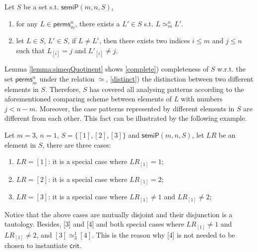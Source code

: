 \documentclass[conference]{IEEEtran}
\newcommand\lyj[1]{\textcolor{magenta}{#1}}
\begin{document}
{\vspace{-5pt}
\begin{lemma}\label{lemma:simeqQuotinent}  Let $S $ be a set s.t.  $\mathsf{semiP}(m,n,S)$,
\begin{enumerate}[leftmargin=14pt,noitemsep,nolistsep]
\item \label{complete}  for any $L \in \mathsf{perms}_{m}^{n}$, there exists a $L' \in S$ s.t. $L \simeq_m^n L'$.
\item \label{distinct} let $L \in S$, $L' \in S$, if $L \ne L'$, then there exists two indices $i \le m$ and $j \le n$ such that $L_{[i]}=j$ and $L'_{[i]}\ne j$.
\end{enumerate}
\end{lemma}
\vspace{-5pt}
Lemma \ref{lemma:simeqQuotinent} shows \ref{complete}) completeness of $S$ w.r.t. the set $\mathsf{perms}_{m}^{n}$ under the relation $\simeq$, \ref{distinct})  the distinction between two different elements in $S$. Therefore, $S$ has covered all analysing patterns according to the aforementioned comparing scheme between elements of $L$ with numbers $j<n-m$. Moreover, the case patterns represented by different elements in $S$ are different from each other. This fact can be illustrated by the following example.

\vspace{-5pt}
\begin{example}
Let $m=3$, $n=1$, $S=\{[1],[2],[3]\}$ and  $\mathsf{semiP}(m,n,S)$,  let $LR$ be an element in $S$, there are three cases:
\begin{enumerate}[leftmargin=14pt,noitemsep,nolistsep]
\item $LR=[1]$: it is a special case where $LR_{[1]}=1 $;
\item $LR=[2]$: it is a special case where $LR_{[1]}=2 $;
\item $LR=[3]$: it is a special case where $LR_{[1]}\ne 1$ and $LR_{[1]}\ne 2$;
\end{enumerate}
\end{example}
\vspace{-5pt}
Notice that the above cases are mutually disjoint and their disjunction  is a tautology. Besides, [3] and [4] and both special cases where $LR_{[1]}\ne 1$ and $LR_{[1]}\ne 2$, and $[3] \simeq_3^1 [4]$. This is the reason why [4] is not needed to be chosen to instantiate $\mathsf{crit}$.

}
\end{document}
